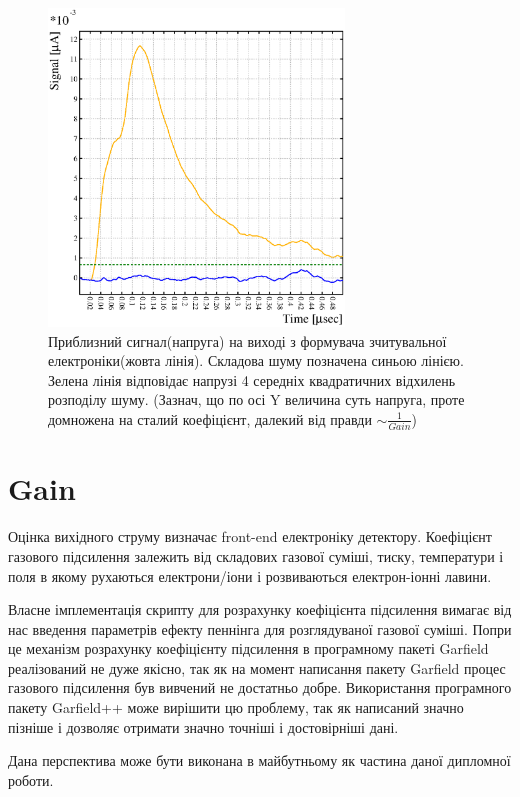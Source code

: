 \documentclass[]{article}
\begin{document}
	\begin{figure}
	\centering
	\includegraphics[width=0.7\textwidth]{signal_noise_threshold.eps}
	\caption{ Приблизний сигнал(напруга) на виході з формувача зчитувальної електроніки(жовта лінія). Складова шуму позначена синьою лінією. Зелена лінія відповідає напрузі 4 середніх квадратичних відхилень розподілу шуму. (Зазнач, що по осі Y величина суть напруга, проте домножена на сталий коефіцієнт, далекий від правди $\sim \frac{1}{Gain}$)}
	\label{fig:signal_example}
	\end{figure}
	
	\section{Gain}
	Оцінка вихідного струму визначає front-end електроніку детектору. Коефіцієнт газового підсилення залежить від складових газової суміші, тиску, температури і поля в якому рухаються електрони/іони і розвиваються електрон-іонні лавини.
	
	Власне імплементація скрипту для розрахунку коефіцієнта підсилення вимагає від нас введення параметрів ефекту пеннінга \cite{} для розглядуваної газової суміші. Попри це механізм розрахунку коефіцієнту підсилення в програмному пакеті Garfield реалізований не дуже якісно, так як на момент написання пакету Garfield процес газового підсилення був вивчений не достатньо добре. Використання програмного пакету Garfield++ може вирішити цю проблему, так як написаний значно пізніше і дозволяє отримати значно точніші і достовірніші дані.
	
	Дана перспектива може бути виконана в майбутньому як частина даної дипломної роботи.
	
\end{document}
